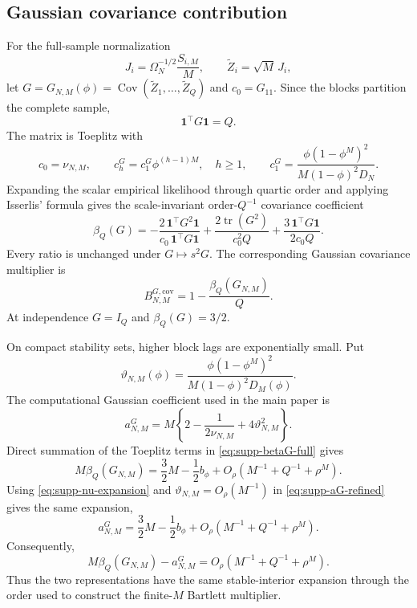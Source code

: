 \documentclass[12pt]{article}
\theoremstyle{remark}
\begin{document}
\subsection{Gaussian covariance contribution}
For the full-sample normalization
\[
J_i=\Omega_N^{-1/2}\frac{S_{i,M}}{M},\qquad
\widetilde Z_i=\sqrt M\,J_i,
\]
let $G=G_{N,M}(\phi)=\operatorname{Cov}(\widetilde Z_1,\ldots,\widetilde Z_Q)$ and $c_0=G_{11}$. Since the blocks partition the complete sample,
\[
\mathbf1^\top G\mathbf1=Q.
\]
The matrix is Toeplitz with
\[
c_0=\nu_{N,M},\qquad
c_h^G=c_1^G\phi^{(h-1)M},\quad h\ge1,
\qquad
c_1^G=\frac{\phi(1-\phi^M)^2}{M(1-\phi)^2D_N}.
\]
Expanding the scalar empirical likelihood through quartic order and applying Isserlis' formula gives the scale-invariant order-$Q^{-1}$ covariance coefficient
\begin{equation}
\beta_Q(G)
=-\frac{2\,\mathbf1^\top G^2\mathbf1}{c_0\,\mathbf1^\top G\mathbf1}
+\frac{2\operatorname{tr}(G^2)}{c_0^2Q}
+\frac{3\,\mathbf1^\top G\mathbf1}{2c_0Q}.
\label{eq:supp-betaG-full}
\end{equation}
Every ratio is unchanged under $G\mapsto s^2G$. The corresponding Gaussian covariance multiplier is
\[
B^{G,\mathrm{cov}}_{N,M}=1-\frac{\beta_Q(G_{N,M})}{Q}.
\]
At independence $G=I_Q$ and $\beta_Q(G)=3/2$.

On compact stability sets, higher block lags are exponentially small. Put
\[
\vartheta_{N,M}(\phi)
=\frac{\phi(1-\phi^M)^2}{M(1-\phi)^2D_M(\phi)}.
\]
The computational Gaussian coefficient used in the main paper is
\begin{equation}
a^G_{N,M}
=M\left\{2-\frac{1}{2\nu_{N,M}}+4\vartheta_{N,M}^2\right\}.
\label{eq:supp-aG-refined}
\end{equation}
Direct summation of the Toeplitz terms in \eqref{eq:supp-betaG-full} gives
\begin{equation*}
M\beta_Q(G_{N,M})
=\frac32M-\frac12b_\phi
+O_\rho(M^{-1}+Q^{-1}+\rho^M).
\end{equation*}
Using \eqref{eq:supp-nu-expansion} and
$\vartheta_{N,M}=O_\rho(M^{-1})$ in \eqref{eq:supp-aG-refined} gives the same
expansion,
\begin{equation*}
a^G_{N,M}=\frac32M-\frac12b_\phi
+O_\rho(M^{-1}+Q^{-1}+\rho^M).
\end{equation*}
Consequently,
\begin{equation}
M\beta_Q(G_{N,M})-a^G_{N,M}
=O_\rho(M^{-1}+Q^{-1}+\rho^M).
\label{eq:supp-betaG-aG-difference}
\end{equation}
Thus the two representations have the same stable-interior expansion through the order used to construct the finite-$M$ Bartlett multiplier.
\end{document}

